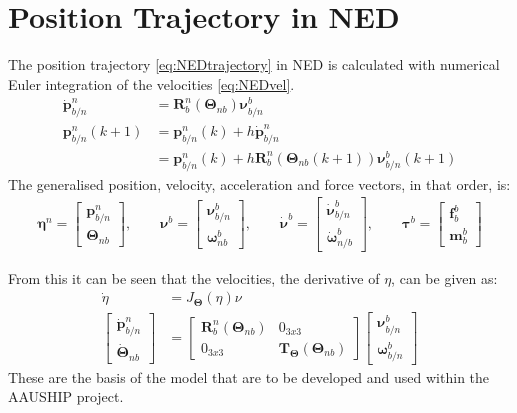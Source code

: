 \section{Position Trajectory in \acs{NED}}
The position trajectory \vref{eq:NEDtrajectory} in \ac{NED} is calculated with numerical Euler integration of the velocities \vref{eq:NEDvel}.
\begin{subequations}
\begin{align}
\dot{\mathbf{p}}^n _{b/n} &= \mathbf{R}^n _b (\boldsymbol{\Theta}_{nb}) \boldsymbol{\nu}^b _{b/n} \label{eq:NEDvel}\\
\mathbf{p}^n _{b/n}(k+1) &= \mathbf{p}^n _{b/n}(k) + h \dot{\mathbf{p}}^n _{b/n} \label{eq:NEDtrajectory} \\
&= \mathbf{p}^n _{b/n}(k) + h \mathbf{R}^n _b
(\boldsymbol{\Theta}_{nb}(k+1)) \boldsymbol{\nu}^b _{b/n}(k+1) 
\end{align}
\end{subequations}
The generalised position, velocity, acceleration and force vectors, in that order, is:
\begin{align}
\boldsymbol{\eta}^n =
\begin{bmatrix}
\mathbf{p}^n _{b/n}\\\boldsymbol{\Theta}_{nb}
\end{bmatrix},\qquad
\boldsymbol{\nu}^b =
\begin{bmatrix}
\boldsymbol{\nu}^b _{b/n}\\\boldsymbol{\omega}^b _{nb}
\end{bmatrix},\qquad
\dot{\boldsymbol{\nu}}^b =
\begin{bmatrix}
\dot{\boldsymbol{\nu}}^b _{b/n}\\\dot{\boldsymbol{\omega}}^b _{n/b}
\end{bmatrix},\qquad
\boldsymbol{\tau}^b =
\begin{bmatrix}
\mathbf{f}^b _b\\\mathbf{m}^b _b
\end{bmatrix}
\end{align}

From this it can be seen that the velocities, the derivative of $\eta$, can be given as:
\begin{align}
\dot \eta &= J_{\boldsymbol{\Theta}}(\eta)\nu\\
\begin{bmatrix}
\dot{\mathbf{p}}^n _{b/n}\\\dot{\boldsymbol{\Theta}}_{nb}
\end{bmatrix}
&=
\begin{bmatrix}
\boldsymbol{R}^n_b(\boldsymbol{\Theta}_{nb}) & 0_{3x3} \\
0_{3x3} & \boldsymbol{T}_{\boldsymbol{\Theta}}(\boldsymbol{\Theta}_{nb})
\end{bmatrix}
\begin{bmatrix}
\boldsymbol{\nu}^b_{b/n}\\\boldsymbol{\omega}^b_{b/n}
\end{bmatrix}
\end{align}
These are the basis of the model that are to be developed and used within the AAUSHIP project.


